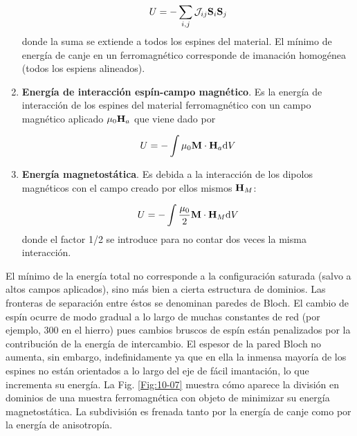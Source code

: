 \begin{enumerate}[label=\alph*)]
	\begin{equation}
		U = - \sum_{i,j}\mathcal{J}_{ij} \mathbf{S}_i \mathbf{S}_j
	\end{equation}
	donde la suma se extiende a todos los espines del material. El mínimo de energía de canje en un ferromagnético corresponde de imanación homogénea (todos los espiens alineados).
	\item \textbf{Energía de interacción espín-campo magnético}. Es la energía de interacción de los espines del material ferromagnético con un campo magnético aplicado $\mu_0 \mathbf{H}_a$ que viene dado por 
	
	\begin{equation}
		U = - \int \mu_0\mathbf{M} \cdot \mathbf{H}_a \mathrm{d} V
	\end{equation}
	\item \textbf{Energía magnetostática}. Es debida a la interacción de los dipolos magnéticos con el campo creado por ellos mismos $\mathbf{H}_M$:
	
	\begin{equation}
		U = - \int \frac{\mu_0}{2}\mathbf{M} \cdot \mathbf{H}_M \mathrm{d} V
	\end{equation}
	donde el factor 1/2 se introduce para no contar dos veces la misma interacción. 
	
\end{enumerate}
El mínimo de la energía total no corresponde a la configuración saturada (salvo a altos campos aplicados), sino más bien a cierta estructura de dominios. Las fronteras de separación entre éstos se denominan paredes de Bloch. El cambio de espín ocurre de modo gradual a lo largo de muchas constantes de red (por ejemplo, 300 en el hierro) pues cambios bruscos de espín están penalizados por la contribución de la energía de intercambio. El espesor de la pared Bloch no aumenta, sin embargo, indefinidamente ya que en ella la inmensa mayoría de los espines no están orientados a lo largo del eje de fácil imantación, lo que incrementa su energía. La Fig. \ref{Fig:10-07} muestra cómo aparece la división en dominios de una muestra ferromagnética con objeto de minimizar su energía magnetostática. La subdivisión es frenada tanto por la energía de canje como por la energía de anisotropía.


